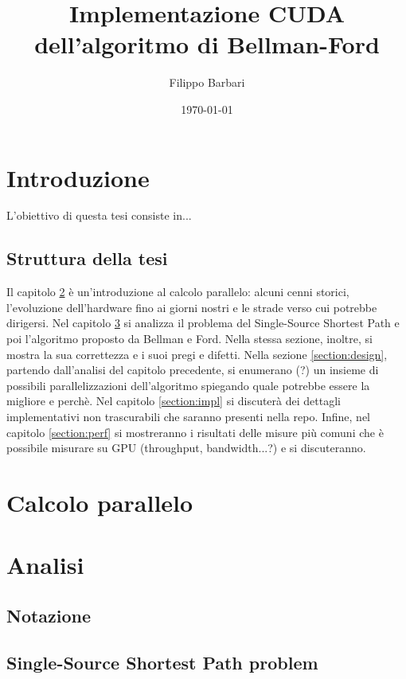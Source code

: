 \documentclass{article}
\title{Implementazione CUDA dell'algoritmo di Bellman-Ford}
\author{Filippo Barbari}
\date{\today}
\begin{document}
	
	\maketitle
	\newpage
	
	\tableofcontents
	\newpage
	
	\listoffigures
	\newpage
	
	\listoftables
	\newpage
	
	\listofalgorithms
	\newpage
	
	\section{Introduzione}
	L'obiettivo di questa tesi consiste in...
	
	\subsection{Struttura della tesi}
	Il capitolo \ref{section:storia} è un'introduzione al calcolo parallelo: alcuni cenni storici, l'evoluzione dell'hardware fino ai giorni nostri e le strade verso cui potrebbe dirigersi. Nel capitolo \ref{section:analisi} si analizza il problema del Single-Source Shortest Path e poi l'algoritmo proposto da Bellman e Ford. Nella stessa sezione, inoltre, si mostra la sua correttezza e i suoi pregi e difetti. Nella sezione \ref{section:design}, partendo dall'analisi del capitolo precedente, si enumerano (?) un insieme di possibili parallelizzazioni dell'algoritmo spiegando quale potrebbe essere la migliore e perchè. Nel capitolo \ref{section:impl} si discuterà dei dettagli implementativi non trascurabili che saranno presenti nella repo. Infine, nel capitolo \ref{section:perf} si mostreranno i risultati delle misure più comuni che è possibile misurare su GPU (throughput, bandwidth...?) e si discuteranno.
	
	\section{Calcolo parallelo}
	\label{section:storia}
	
	\section{Analisi}
	\label{section:analisi}
	\subsection{Notazione}
	\subsection{Single-Source Shortest Path problem}
\end{document}
